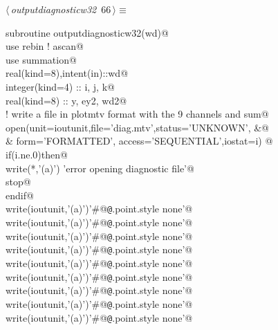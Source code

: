 \documentclass[10pt,a4paper,notitlepage]{article}
\begin{document}
\begin{flushleft} \small\label{scrap70}\raggedright\small
{} $\langle\,${\it outputdiagnosticw32}\nobreak\ {\footnotesize {66}}$\,\rangle\equiv$
\vspace{-1ex}
\begin{list}{}{} \item
\mbox{}\verb@      subroutine outputdiagnosticw32(wd)@\\
\mbox{}\verb@      use rebin ! ascan@\\
\mbox{}\verb@      use summation@\\
\mbox{}\verb@      real(kind=8),intent(in)::wd@\\
\mbox{}\verb@      integer(kind=4) :: i, j, k@\\
\mbox{}\verb@      real(kind=8) :: y, ey2, wd2@\\
\mbox{}\verb@! write a file in plotmtv format with the 9 channels and sum@\\
\mbox{}\verb@      open(unit=ioutunit,file='diag.mtv',status='UNKNOWN',              &@\\
\mbox{}\verb@     & form='FORMATTED', access='SEQUENTIAL',iostat=i) @\\
\mbox{}\verb@      if(i.ne.0)then@\\
\mbox{}\verb@       write(*,'(a)') 'error opening diagnostic file'@\\
\mbox{}\verb@       stop@\\
\mbox{}\verb@      endif@\\
\mbox{}\verb@      write(ioutunit,'(a)')'#@{\tt @}\verb@set[0].point.style none'@\\
\mbox{}\verb@      write(ioutunit,'(a)')'#@{\tt @}\verb@set[1].point.style none'@\\
\mbox{}\verb@      write(ioutunit,'(a)')'#@{\tt @}\verb@set[2].point.style none'@\\
\mbox{}\verb@      write(ioutunit,'(a)')'#@{\tt @}\verb@set[3].point.style none'@\\
\mbox{}\verb@      write(ioutunit,'(a)')'#@{\tt @}\verb@set[4].point.style none'@\\
\mbox{}\verb@      write(ioutunit,'(a)')'#@{\tt @}\verb@set[5].point.style none'@\\
\mbox{}\verb@      write(ioutunit,'(a)')'#@{\tt @}\verb@set[6].point.style none'@\\
\mbox{}\verb@      write(ioutunit,'(a)')'#@{\tt @}\verb@set[7].point.style none'@\\
\mbox{}\verb@      write(ioutunit,'(a)')'#@{\tt @}\verb@set[8].point.style none'@\\

\end{list}
\end{flushleft}
\end{document}
